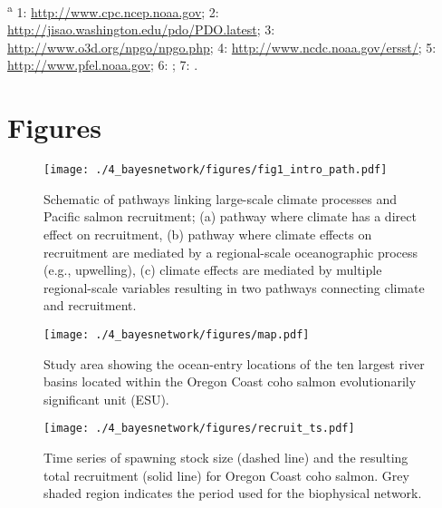 

\noindent \textsuperscript{a} 1: \url{http://www.cpc.ncep.noaa.gov}; 
  2: \url{http://jisao.washington.edu/pdo/PDO.latest}; 3:
  \url{http://www.o3d.org/npgo/npgo.php}; 4:
  \url{http://www.ncdc.noaa.gov/ersst/}; 5: \url{http://www.pfel.noaa.gov}; 6:
  \citet{Peterson2012a}; 7: \citet{PFMC2013}.

\newpage





\newpage



\section{Figures}

\begin{figure}[htbp]
  \centering \texttt{[image: ./4\_bayesnetwork/figures/fig1\_intro\_path.pdf]}
  \caption{Schematic of pathways linking large-scale climate processes and
    Pacific salmon recruitment; (a) pathway where climate has a direct effect on
    recruitment, (b) pathway where climate effects on recruitment are mediated
    by a regional-scale oceanographic process (e.g., upwelling), (c) climate
    effects are mediated by multiple regional-scale variables resulting in two
    pathways connecting climate and recruitment.}
  \label{fig:bn:1}
\end{figure}

\begin{figure}[htbp]
  \centering \texttt{[image: ./4\_bayesnetwork/figures/map.pdf]}
  \caption{Study area showing the ocean-entry locations of the ten largest river
    basins located within the Oregon Coast coho salmon evolutionarily
    significant unit (ESU).}
  \label{fig:bn:2}
\end{figure}

\begin{figure}[htbp]
  \centering \texttt{[image: ./4\_bayesnetwork/figures/recruit\_ts.pdf]}
  \caption{Time series of spawning stock size (dashed line) and the resulting
    total recruitment (solid line) for Oregon Coast coho salmon. Grey shaded
    region indicates the period used for the biophysical network.}
  \label{fig:bn:3}
\end{figure}

